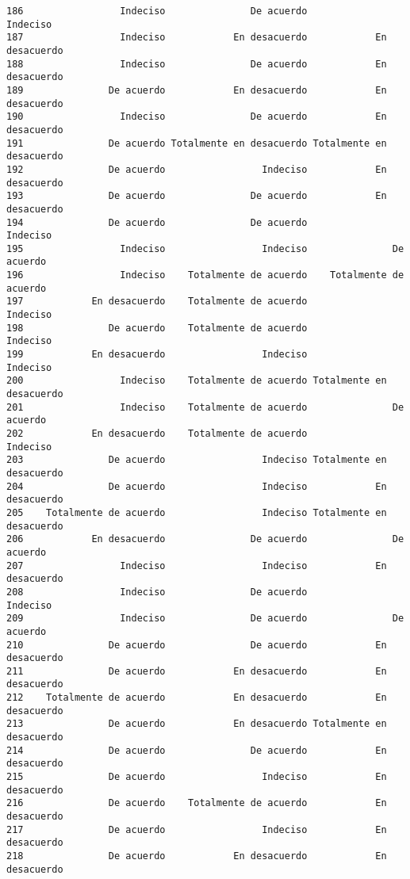 \documentclass[
  letterpaper,
  DIV=11,
  numbers=noendperiod]{scrartcl}
\begin{document}
\begin{verbatim}
186                 Indeciso               De acuerdo                 Indeciso
187                 Indeciso            En desacuerdo            En desacuerdo
188                 Indeciso               De acuerdo            En desacuerdo
189               De acuerdo            En desacuerdo            En desacuerdo
190                 Indeciso               De acuerdo            En desacuerdo
191               De acuerdo Totalmente en desacuerdo Totalmente en desacuerdo
192               De acuerdo                 Indeciso            En desacuerdo
193               De acuerdo               De acuerdo            En desacuerdo
194               De acuerdo               De acuerdo                 Indeciso
195                 Indeciso                 Indeciso               De acuerdo
196                 Indeciso    Totalmente de acuerdo    Totalmente de acuerdo
197            En desacuerdo    Totalmente de acuerdo                 Indeciso
198               De acuerdo    Totalmente de acuerdo                 Indeciso
199            En desacuerdo                 Indeciso                 Indeciso
200                 Indeciso    Totalmente de acuerdo Totalmente en desacuerdo
201                 Indeciso    Totalmente de acuerdo               De acuerdo
202            En desacuerdo    Totalmente de acuerdo                 Indeciso
203               De acuerdo                 Indeciso Totalmente en desacuerdo
204               De acuerdo                 Indeciso            En desacuerdo
205    Totalmente de acuerdo                 Indeciso Totalmente en desacuerdo
206            En desacuerdo               De acuerdo               De acuerdo
207                 Indeciso                 Indeciso            En desacuerdo
208                 Indeciso               De acuerdo                 Indeciso
209                 Indeciso               De acuerdo               De acuerdo
210               De acuerdo               De acuerdo            En desacuerdo
211               De acuerdo            En desacuerdo            En desacuerdo
212    Totalmente de acuerdo            En desacuerdo            En desacuerdo
213               De acuerdo            En desacuerdo Totalmente en desacuerdo
214               De acuerdo               De acuerdo            En desacuerdo
215               De acuerdo                 Indeciso            En desacuerdo
216               De acuerdo    Totalmente de acuerdo            En desacuerdo
217               De acuerdo                 Indeciso            En desacuerdo
218               De acuerdo            En desacuerdo            En desacuerdo

\end{verbatim}
\end{document}
